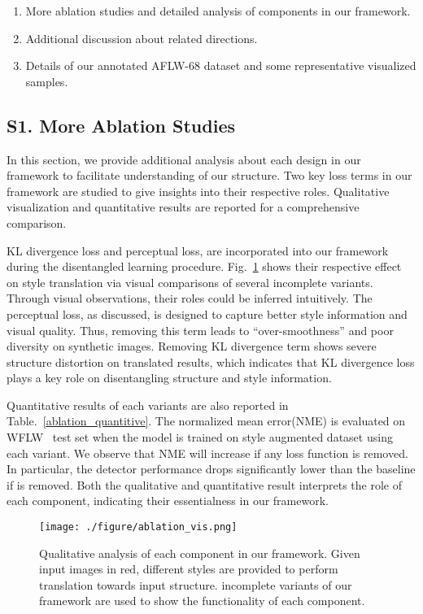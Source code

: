 \documentclass[10pt,twocolumn,letterpaper]{article}
\begin{document}
\begin{enumerate}
    \item More ablation studies and detailed analysis of components in our framework. 
    \item Additional discussion about related directions.
    \item Details of our annotated AFLW-68 dataset and some representative visualized samples.
\end{enumerate}

\subsection*{S1. More Ablation Studies}
In this section, we provide additional analysis about each design in our framework to facilitate understanding of our structure. Two key loss terms in our framework are studied to give insights into their respective roles. Qualitative visualization and quantitative results are reported for a comprehensive comparison.

KL divergence loss and perceptual loss, are incorporated into our framework during the disentangled learning procedure. Fig.~\ref{fig:ablation_vis} shows their respective effect on style translation via visual comparisons of several incomplete variants. Through visual observations, their roles could be inferred intuitively. The perceptual loss, as discussed, is designed to capture better style information and visual quality. Thus, removing this term leads to ``over-smoothness'' and poor diversity on synthetic images. Removing KL divergence term shows severe structure distortion on translated results, which indicates that KL divergence loss plays a key role on disentangling structure and style information. 

Quantitative results of each variants are also reported in Table.~\ref{ablation_quantitive}. The normalized mean error(NME) is evaluated on WFLW~\cite{LAB} test set when the model is trained on style augmented dataset using each variant. We observe that NME will increase if any loss function is removed. In particular, the detector performance drops significantly lower than the baseline if  is removed. Both the qualitative and quantitative result interprets the role of each component, indicating their essentialness in our framework. 

\begin{figure}[htb]
	\begin{center}
		\texttt{[image: ./figure/ablation\_vis.png]}
	\end{center}
	\vspace{-0.5cm}
	\caption{\small{Qualitative analysis of each component in our framework. Given input images in red,  different styles are provided to perform translation towards input structure.  incomplete variants of our framework are used to show the functionality of each component.}}
	\vspace{-0.2cm}
	\label{fig:ablation_vis}
\end{figure}
\end{document}
